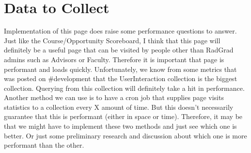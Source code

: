 \documentclass[english]{proposalnsf}
\begin{document}
  \section{Data to Collect}
  \label{sec:data-to-collect}
  Implementation of this page does raise some performance questions to answer.
  Just like the Course/Opportunity Scoreboard, I think that this page will definitely be a useful page that can be visited by people other than RadGrad admins such as Advisors or Faculty.
  Therefore it is important that page is performant and loads quickly.
  Unfortunately, we know from some metrics that was posted on \#development that the UserInteraction collection is the biggest collection.
  Querying from this collection will definitely take a hit in performance.
  Another method we can use is to have a cron job that supplies page visits statistics to a collection every X amount of time.
  But this doesn't necessarily guarantee that this is performant (either in space or time).
  Therefore, it may be that we might have to implement these two methods and just see which one is better.
  Or just some preliminary research and discussion about which one is more performant than the other.

  
  

  \appendix
\end{document}
